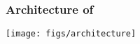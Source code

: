 \documentclass[fleqn]{beamer}
\begin{document}







\begin{frame}
  \frametitle{Architecture of \tlaps}

  \centerline{\texttt{[image: figs/architecture]}}
\end{frame}
\end{document}
